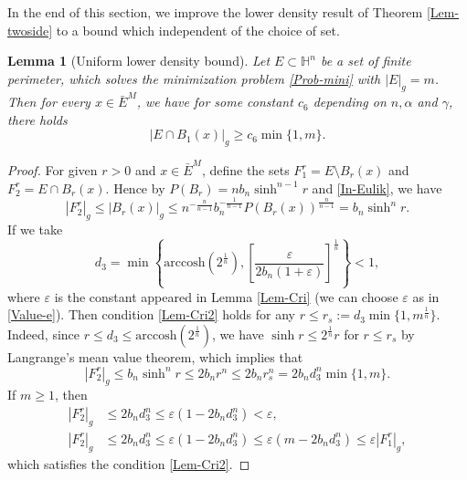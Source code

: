 \documentclass[11pt,reqno]{amsart}
\newtheorem{lem}[thm]{Lemma}
\theoremstyle{definition}
\theoremstyle{remark}
\numberwithin{equation}{section}
\renewcommand{\(}{\left(}
\renewcommand{\)}{\right)}
\renewcommand{\-}{\overline}
\begin{document}
In the end of this section, we improve the lower density result of Theorem \ref{Lem-twoside} to a bound which independent of the choice of set.
\begin{lem}[Uniform lower density bound]\label{Lem-ULB}
	Let $E\subset\mathbb{H}^n$ be a set of finite perimeter, which solves the minimization problem \eqref{Prob-mini} with $|E|_g=m$. Then for every $x\in\bar{E}^M$, we have for some constant $c_6$ depending on $n,\alpha$ and $\gamma$, there holds
	\begin{equation}\label{Lem-ULB!}
		|E\cap B_1(x)|_g\geq c_6\min\{1,m\}.
	\end{equation}
\end{lem}
\begin{proof}
	For given $r>0$ and $x\in\bar{E}^M$, define the sets $F_1^r=E\setminus B_r(x)$ and $F_2^r=E\cap B_r(x)$.  Hence by $P(B_r)=n b_n\sinh^{n-1} r$ and \eqref{In-Eulik}, we have
	\begin{equation}\label{Eq-ULB1}
		|F_2^r|_g\leq |B_r(x)|_g\leq n^{-\frac{n}{n-1}}b_n^{-\frac{1}{n-1}}P(B_r(x))^{\frac{n}{n-1}}=b_n\sinh^n r.
	\end{equation}
	If we take
	\begin{equation}\label{Eq-ULB2}
		d_3=\min\left\{\mathrm{arccosh}(2^{\frac{1}{n}}),\left[\frac{\varepsilon}{2b_n(1+\varepsilon)}\right]^{\frac{1}{n}}\right\}<1,
	\end{equation}
	where $\varepsilon$ is the constant appeared in Lemma \ref{Lem-Cri} (we can choose $\varepsilon$ as in \eqref{Value-e}). Then condition \eqref{Lem-Cri2} holds for any $r\leq r_s:=d_3\min\{1,m^{\frac{1}{n}}\}$. Indeed, since $r\leq d_3\leq {\mathrm{arccosh}(2^{\frac{1}{n}})}$, we have $\sinh r\leq 2^{\frac{1}{n}} r$ for $r\leq r_s$  by Langrange's mean value theorem, which implies that 
	\begin{equation}\label{Eq-ULB3}
		|F_2^r|_g\leq b_n\sinh^n r\leq 2b_n r^n\leq 2b_n r_s^n=2b_n d_3^n\min\{1,m\}.
	\end{equation}
	If $m\geq 1$, then 
	\begin{align*}
	|F_2^r|_g&\leq 2b_n d_3^n\leq\varepsilon(1-2b_n d_3^n)<\varepsilon,\\
	|F_2^r|_g&\leq 2b_n d_3^n\leq\varepsilon(1-2b_n d_3^n)\leq \varepsilon(m-2b_n d_3^n)\leq \varepsilon|F_1^r|_g,
	\end{align*}
	which satisfies the condition \eqref{Lem-Cri2}.
		

\end{proof}
\end{document}
